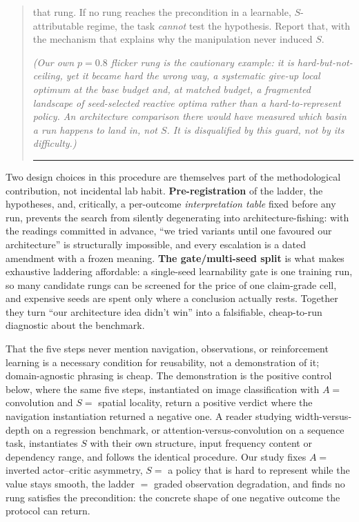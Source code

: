 \documentclass[10pt]{article}
\begin{document}
\begin{quote}
\begin{enumerate}
   that rung. If no rung reaches the precondition in a learnable,
   $S$-attributable regime, the task \emph{cannot} test the hypothesis. Report that, with
   the mechanism that explains why the manipulation never induced $S$.
\end{enumerate}
\emph{(Our own $p=0.8$ flicker rung is the cautionary example: it is hard-but-not-ceiling,
yet it became hard the wrong way, a systematic give-up local optimum at the base budget and,
at matched budget, a fragmented landscape of seed-selected reactive optima rather than a
hard-to-represent policy. An architecture comparison there would have measured which basin a
run happens to land in, not $S$. It is disqualified by this guard, not by its
difficulty.)}\\[0.2em]
\rule{\linewidth}{0.6pt}
\end{quote}

Two design choices in this procedure are themselves part of the methodological contribution,
not incidental lab habit. \textbf{Pre-registration} of the ladder, the hypotheses, and,
critically, a per-outcome \emph{interpretation table} fixed before any run, prevents the
search from silently degenerating into architecture-fishing: with the readings committed in
advance, ``we tried variants until one favoured our architecture'' is structurally
impossible, and every escalation is a dated amendment with a frozen meaning. \textbf{The
gate/multi-seed split} is what makes exhaustive laddering affordable: a single-seed
learnability gate is one training run, so many candidate rungs can be screened for the price
of one claim-grade cell, and expensive seeds are spent only where a conclusion actually
rests. Together they turn ``our architecture idea didn't win'' into a falsifiable,
cheap-to-run diagnostic about the benchmark.

That the five steps never mention navigation, observations, or reinforcement learning is a
necessary condition for reusability, not a demonstration of it; domain-agnostic phrasing is
cheap. The demonstration is the positive control below, where the same five steps,
instantiated on image classification with $A = $ convolution and $S = $ spatial locality,
return a positive verdict where the navigation instantiation returned a negative one. A
reader studying width-versus-depth on a regression benchmark, or
attention-versus-convolution on a sequence task, instantiates $S$ with their own structure,
input frequency content or dependency range, and follows the identical procedure. Our study
fixes $A = $ inverted actor--critic asymmetry, $S = $ a policy that is hard to represent
while the value stays smooth, the ladder $=$ graded observation degradation, and finds no
rung satisfies the precondition: the concrete shape of one negative outcome the protocol can
return.
\end{document}
